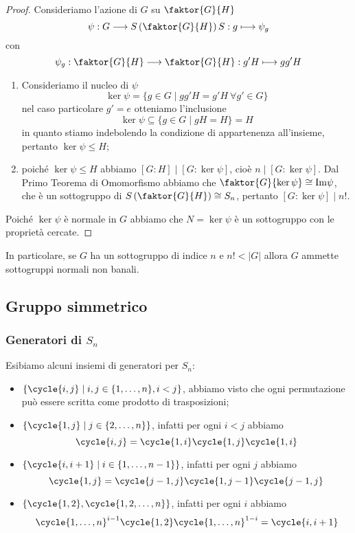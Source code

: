 \documentclass[11pt]{scrartcl}
\begin{document}
\begin{proof}
    Consideriamo l'azione di $G$ su $\faktor{G}{H}$
    \[
        \psi: G\longrightarrow S\left(\faktor{G}{H}\right)S:g\longmapsto \psi_g
    \]
    con
    \[
        \psi_g:\faktor{G}{H}\longrightarrow\faktor{G}{H} : g'H\longmapsto gg'H
    \]
    \begin{enumerate}[(1)]
        \item Consideriamo il nucleo di $\psi$
        \[
            \ker\psi = \{g \in G\mid gg'H = g'H~\forall g' \in G\}
        \]
        nel caso particolare $g' = e$ otteniamo l'inclusione
        \[
            \ker\psi \subseteq \{g \in G \mid gH = H\} = H
        \]
        in quanto stiamo indebolendo la condizione di appartenenza all'insieme,
        pertanto $\ker\psi \leqslant H$;
        \item poiché $\ker\psi \leqslant H$ abbiamo $[G:H]\mid [G:\ker\psi]$, cioè
        $n \mid [G:\ker\psi]$. Dal Primo Teorema di Omomorfismo abbiamo che
        $\faktor{G}{\ker\psi} \cong \mathrm{Im\psi}$, che è un sottogruppo
        di $S\left(\faktor{G}{H}\right)\cong S_n$, pertanto $[G:\ker\psi]\mid n!$.
    \end{enumerate}
    Poiché $\ker\psi$ è normale in $G$ abbiamo che $N = \ker\psi$ è un sottogruppo
    con le proprietà cercate.
\end{proof}

\begin{remark}
    In particolare, se $G$ ha un sottogruppo di indice $n$ e $n! < |G|$
    allora $G$ ammette sottogruppi normali non banali.
\end{remark}

\newpage

\subsection{Gruppo simmetrico}

\subsubsection{Generatori di $S_n$}

Esibiamo alcuni insiemi di generatori per $S_n$:

\begin{itemize}
    \item $\{\cycle{i, j} \mid i, j \in\{1, \ldots, n\}, i < j\}$, abbiamo visto 
    che ogni permutazione può essere scritta come prodotto di trasposizioni;
    \item $\{\cycle{1, j}\mid j \in \{2, \ldots, n\}\}$, infatti per ogni $i<j$ abbiamo
    \[
        \cycle{i, j} = \cycle{1, i}\cycle{1, j}\cycle{1, i}
    \]
    \item $\{\cycle{i, i + 1}\mid i \in\{1, \ldots, n - 1\}\}$,
    infatti per ogni $j$ abbiamo 
    \[
        \cycle{1, j} = \cycle{j - 1, j}\cycle{1, j - 1}\cycle{j - 1, j}
    \]
    \item $\{\cycle{1, 2}, \cycle{1, 2, \ldots, n}\}$, infatti per ogni
    $i$ abbiamo 
    \[
        \cycle{1, \ldots, n}^{i - 1}\cycle{1, 2}\cycle{1, \ldots, n}^{1 - i} = 
        \cycle{i, i + 1}
    \]
\end{itemize}
\end{document}
